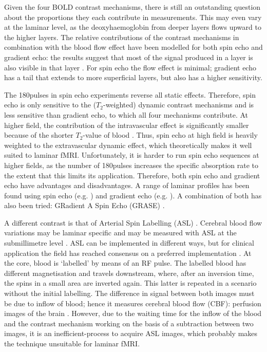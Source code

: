 Given the four BOLD contrast mechanisms, there is still an outstanding question about the proportions they each contribute in measurements. This may even vary at the laminar level, as the deoxyhaemoglobin from deeper layers flows upward to the higher layers. The relative contributions of the contrast mechanisms in combination with the blood flow effect have been modelled for both spin echo and gradient echo: the results suggest that most of the signal produced in a layer is also visible in that layer \cite{Markuerkiaga2016,Uludag2017}. For spin echo the flow effect is minimal; gradient echo has a tail that extends to more superficial layers, but also has a higher sensitivity.

The 180\textdegree pulses in spin echo experiments reverse all static effects. Therefore, spin echo is only sensitive to the ($T_2$-weighted) dynamic contrast mechanisms and is less sensitive than gradient echo, to which all four mechanisms contribute. At higher field, the contribution of the intravascular effect is significantly smaller because of the shorter $T_2$-value of blood \cite{Norris2006}. Thus, spin echo at high field is heavily weighted to the extravascular dynamic effect, which theoretically makes it well suited to laminar fMRI. Unfortunately, it is harder to run spin echo sequences at higher fields, as the number of 180\textdegree pulses increases the specific absorption rate to the extent that this limits its application. Therefore, both spin echo and gradient echo have advantages and disadvantages. A range of laminar profiles has been found using spin echo (e.g. \cite{Zhao2004,Harel2006,Goense2006}) and gradient echo (e.g. \cite{Polimeni2010,DeMartino2013,Chen2013}). A combination of both has also been tried: GRadient A Spin Echo (GRASE) \cite{Olman2012,DeMartino2013}.

A different contrast is that of Arterial Spin Labelling (ASL) \cite{Williams1992,Detre1994}. Cerebral blood flow variations may be laminar specific \cite{Gerrits2000} and may be measured with ASL at the submillimetre level \cite{Ivanov2016}. ASL can be implemented in different ways, but for clinical application the field has reached consensus on a preferred implementation \cite{Alsop2015}. At the core, blood is `labelled' by means of an RF pulse. The labelled blood has different magnetisation and travels downstream, where, after an inversion time, the spins in a small area are inverted again. This latter is repeated in a scenario without the initial labelling. The difference in signal between both images must be due to inflow of blood; hence it measures cerebral blood flow (CBF): perfusion images of the brain \cite{Petcharunpaisan2010}. However, due to the waiting time for the inflow of the blood and the contrast mechanism working on the basis of a subtraction between two images, it is an inefficient-process to acquire ASL images, which probably makes the technique unsuitable for laminar fMRI.

